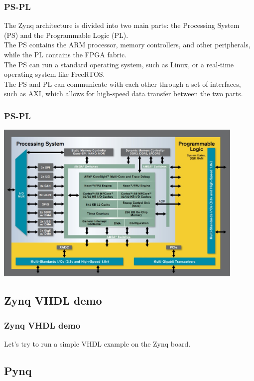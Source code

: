 \documentclass{beamer}
\begin{document}
\begin{frame}\frametitle{PS-PL}
The Zynq architecture is divided into two main parts:
 the Processing System (PS) and the Programmable Logic 
 (PL). \\
\vspace{0.7cm}
The PS contains the ARM processor, memory controllers,
and other peripherals, while the PL contains the FPGA fabric. \\
\vspace{0.7cm}
The PS can run a standard operating system, such as Linux,
or a real-time operating system like FreeRTOS. \\
\vspace{0.7cm}
The PS and PL can communicate with each other through a set of
interfaces, such as AXI, which allows for high-speed data transfer
between the two parts. \\
\end{frame}

\begin{frame}\frametitle{PS-PL}
\centering
\includegraphics[width=0.9\textwidth]{zynq-pl-ps.jpg}
\end{frame}

\subsection{Zynq VHDL demo}

\begin{frame}\frametitle{Zynq VHDL demo}
\centering
Let's try to run a simple VHDL example on the Zynq board. 
\end{frame}

\subsection{Pynq}
\end{document}
